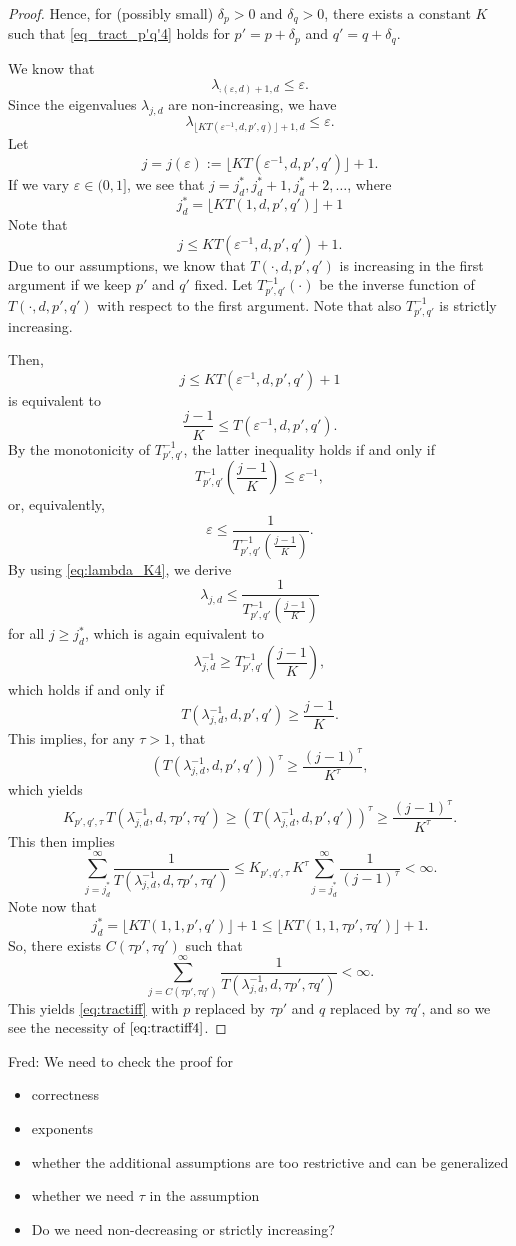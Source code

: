 \documentclass[11pt,a4paper]{article}
\newcommand{\fred}[1]{\begingroup\color{blue}Fred: #1\endgroup}
\begin{document}
{\begin{proof}
Hence, for (possibly small) $\delta_p>0$ and $\delta_q>0$, there exists a constant $K$ such that \eqref{eq_tract_p'q'4} holds for $p'=p+\delta_p$ 
and $q'=q+\delta_q$.

We know that
\[
\lambda_{\comp(\varepsilon,d)+1,d}\le \varepsilon.
\]
Since the eigenvalues $\lambda_{j,d}$ are non-increasing, we have
\begin{equation}\label{eq:lambda_K4}
\lambda_{\lfloor K T(\varepsilon^{-1},d,p',q)\rfloor +1,d}\le \varepsilon.
\end{equation}
Let
\[
j=j (\varepsilon):= \lfloor K T(\varepsilon^{-1},d,p',q')\rfloor +1.
\]
If we vary $\varepsilon\in (0,1]$, we see that $j=j_d^*, j_d^*+1, j_d^*+2,\ldots$, where 
\[
  j_d^*=\lfloor K T(1,d,p',q')\rfloor +1
\]
Note that
\[
j\le K T(\varepsilon^{-1},d,p',q') +1.
\]
Due to our assumptions, we know that 
$T(\cdot,d,p',q')$ is increasing in the first argument if 
we keep $p'$ and $q'$ fixed. Let $T_{p',q'}^{-1} (\cdot)$ be the inverse function of $T(\cdot,d,p',q')$ with respect to the first argument. Note that also $T_{p',q'}^{-1}$ is strictly increasing. 

Then, 
\[
j \le K T(\varepsilon^{-1},d,p',q') +1
\]
is equivalent to
\[
\frac{j-1}{K } \le T(\varepsilon^{-1},d,p',q').
\]
By the monotonicity of $T_{p',q'}^{-1}$, the latter inequality holds if and only if
\[
  T_{p',q'}^{-1} \left(\frac{j-1}{K} \right)
  \le \varepsilon^{-1},
\]
or, equivalently,
\[
 \varepsilon \le \frac{1}{T_{p',q'}^{-1} \left(\frac{j-1}{K} \right)}.
\]
By using \eqref{eq:lambda_K4}, we derive
\[
 \lambda_{j,d}\le \frac{1}{T_{p',q'}^{-1} \left(\frac{j-1}{K } \right)}
\]
for all $j\ge j_d^*$, which is again equivalent to 
\[
\lambda_{j,d}^{-1}\ge T_{p',q'}^{-1} \left(\frac{j-1}{K} \right),
\]
which holds if and only if
\[ 
T(\lambda_{j,d}^{-1},d, p',q') \ge \frac{j-1}{K}.
\]
This implies, for any $\tau>1$, that 
\[ 
 (T(\lambda_{j,d}^{-1},d, p',q'))^\tau \ge \frac{(j-1)^\tau}{K^\tau },
\]
which yields
\[ 
 K_{p',q',\tau}\, T (\lambda_{j,d}^{-1},d,\tau p',\tau q') \ge (T(\lambda_{j,d}^{-1},d, p',q'))^\tau 
 \ge \frac{(j-1)^\tau}{K^\tau}.
\]
This then implies
\[
\sum_{j=j_d^*}^\infty \frac{1}{T(\lambda_{j,d}^{-1},d, \tau p',\tau q')} 
\le K_{p',q',\tau}\, K^\tau \sum_{j=j_d^*}^\infty \frac{1}{(j-1)^\tau}<\infty.
\]
Note now that
\[
 j_d^* = \lfloor K T(1,1,p',q')\rfloor +1 \le \lfloor KT(1,1,\tau p',\tau q')\rfloor +1.
\]
So, there exists $C(\tau p',\tau q')$ such that 
\[
 \sum_{j=C(\tau p',\tau q')}^\infty \frac{1}{T(\lambda_{j,d}^{-1},d, \tau p',\tau q')}<\infty.
\]
This yields \eqref{eq:tractiff} with $p$ replaced by $\tau p'$ and $q$ replaced by $\tau q'$, and so we see the necessity of $\eqref{eq:tractiff4}$. 

\end{proof}
}
\bigskip

\fred{We need to check the proof for 
\begin{itemize}
\item correctness
\item exponents
\item whether the additional assumptions are too restrictive and can be generalized
\item whether we need $\tau$ in the assumption
\item Do we need non-decreasing or strictly increasing? 
\end{itemize}}
\end{document}

